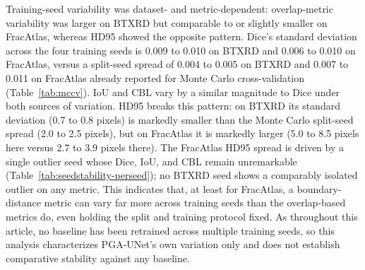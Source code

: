 Training-seed variability was dataset- and metric-dependent: overlap-metric variability was larger on BTXRD but comparable to or slightly smaller on FracAtlas, whereas HD95 showed the opposite pattern. Dice's standard deviation across the four training seeds is 0.009 to 0.010 on BTXRD and 0.006 to 0.010 on FracAtlas, versus a split-seed spread of 0.004 to 0.005 on BTXRD and 0.007 to 0.011 on FracAtlas already reported for Monte Carlo cross-validation (Table~\ref{tab:mccv}). IoU and CBL vary by a similar magnitude to Dice under both sources of variation. HD95 breaks this pattern: on BTXRD its standard deviation (0.7 to 0.8 pixels) is markedly smaller than the Monte Carlo split-seed spread (2.0 to 2.5 pixels), but on FracAtlas it is markedly larger (5.0 to 8.5 pixels here versus 2.7 to 3.9 pixels there). The FracAtlas HD95 spread is driven by a single outlier seed whose Dice, IoU, and CBL remain unremarkable (Table~\ref{tab:seedstability-perseed}); no BTXRD seed shows a comparably isolated outlier on any metric. This indicates that, at least for FracAtlas, a boundary-distance metric can vary far more across training seeds than the overlap-based metrics do, even holding the split and training protocol fixed. As throughout this article, no baseline has been retrained across multiple training seeds, so this analysis characterizes PGA-UNet's own variation only and does not establish comparative stability against any baseline.

\begin{table}[t]
\caption{Per-seed results underlying Table~\ref{tab:seedstability}'s mean $\pm$ SD, at $512\times512$ on the original fixed split, four training seeds (z: covering, s: off-center).}
\label{tab:seedstability-perseed}
\centering
\scriptsize
{}
\end{table}

